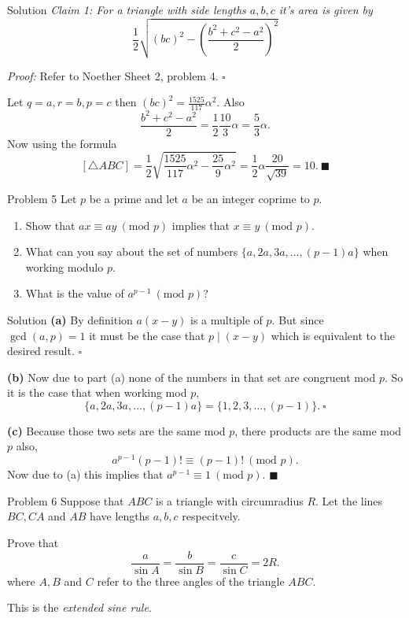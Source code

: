 \documentclass{article}
\begin{document}
\begin{solution}{Solution}
\textit{Claim 1: For a triangle with side lengths $a,b,c$ it's area is
given by
$$ \frac12 \sqrt{(bc)^2 - \left(\frac{b^2 + c^2 - a^2}{2}\right)^2} $$
}

\textit{Proof:} Refer to Noether Sheet 2, problem 4. $\square$
\vspace{0.2cm}

Let $q = a, r = b, p = c$ then $(bc)^2 = \frac{1525}{117}\alpha^2$. Also
$$
\frac{b^2 + c^2 - a^2}{2} = \frac12 \frac{10}{3}\alpha = \frac{5}{3} \alpha.
$$
Now using the formula
$$
[\triangle ABC] = \frac12
\sqrt{\frac{1525}{117}\alpha^2 - \frac{25}{9}\alpha^2} =
\frac12 \alpha \frac{20}{\sqrt{39}} = 10. \ \blacksquare
$$
\end{solution}
\newpage

\begin{problem}{Problem 5}
Let $p$ be a prime and let $a$ be an integer coprime to $p$.
\begin{enumerate}[label=(\alph*)]
  \item Show that $ax \equiv ay \ (\text{mod } p)$ implies that
  $x\equiv y \ (\text{mod } p)$.
  \item What can you say about the set of numbers
  $\{a, 2a, 3a, \ldots, (p-1)a\}$ when working modulo $p$.
  \item What is the value of $a^{p-1} \ (\text{mod } p)$?
\end{enumerate}
\end{problem}

\begin{solution}{Solution}
\textbf{(a)} By definition $a(x-y)$ is a multiple of $p$. But since
$\gcd(a,p) = 1$ it must be the case that $p \mid (x-y)$ which
is equivalent to the desired result. $\square$
\vspace{0.2cm}

\textbf{(b)} Now due to part (a) none of the numbers in that set are
congruent mod $p$. So it is the case that when working mod $p$,
$$
\{a, 2a, 3a, \ldots, (p-1)a\} = \{1,2,3,\ldots, (p-1) \}.\  \square
$$

\textbf{(c)} Because those two sets are the same mod $p$, there products
are the same mod $p$ also,
$$
a^{p-1} (p-1)! \equiv (p-1)! \ (\text{mod } p).
$$
Now due to (a) this implies that $a^{p-1} \equiv 1 \ (\text{mod } p)$.
$\blacksquare$
\end{solution}
\newpage

\begin{problem}{Problem 6}
Suppose that $ABC$ is a triangle with circumradius $R$. Let the lines
$BC, CA$ and $AB$ have lengths $a,b,c$ respecitvely. \vspace{0.2cm}

Prove that
$$
\frac{a}{\sin A} = \frac{b}{\sin B} = \frac{c}{\sin C} = 2R.
$$
where $A,B$ and $C$ refer to the three angles of the triangle $ABC$.
\vspace{0.2cm}

This is the \textit{extended sine rule}.
\end{problem}
\end{document}
